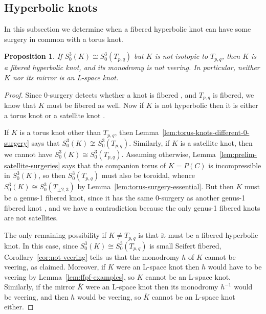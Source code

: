\documentclass[11pt]{amsart}
\newtheorem {proposition}[theorem]{Proposition}
\numberwithin{equation}{section}
\numberwithin{theorem}{section}
\theoremstyle{definition}
\newcommand{\mirror}[1]{\overline{#1}}
\begin{document}
%
%
%

\subsection{Hyperbolic knots}

In this subsection we determine when a fibered hyperbolic knot can have some surgery in common with a torus knot.

\begin{proposition} \label{prop:hyperbolic}
If $S^3_0(K) \cong S^3_0(T_{p,q})$ but $K$ is not isotopic to $T_{p,q}$, then $K$ is a fibered hyperbolic knot, and its monodromy is not veering.  In particular, neither $K$ nor its mirror is an L-space knot.
\end{proposition}

\begin{proof}
Since 0-surgery detects whether a knot is fibered \cite{gabai-foliations3}, and $T_{p,q}$ is fibered, we know that $K$ must be fibered as well.  Now if $K$ is not hyperbolic then it is either a torus knot or a satellite knot \cite[Corollary~2.5]{thurston-kleinian}.

If $K$ is a torus knot other than $T_{p,q}$, then Lemma~\ref{lem:torus-knots-different-0-surgery} says that $S^3_0(K) \not\cong S^3_0(T_{p,q})$.  Similarly, if $K$ is a satellite knot, then we cannot have $S^3_0(K) \cong S^3_0(T_{p,q})$.  Assuming otherwise, Lemma~\ref{lem:prelim-satellite-surgeries} says that the companion torus of $K=P(C)$ is incompressible in $S^3_0(K)$, so then $S^3_0(T_{p,q})$ must also be toroidal, whence $S^3_0(K) \cong S^3_0(T_{\pm2,3})$ by Lemma~\ref{lem:torus-surgery-essential}.  But then $K$ must be a genus-1 fibered knot, since it has the same $0$-surgery as another genus-1 fibered knot \cite{gabai-foliations3}, and we have a contradiction because the only genus-1 fibered knots are not satellites.

The only remaining possibility if $K\neq T_{p,q}$ is that it must be a fibered hyperbolic knot.  In this case, since $S^3_0(K) \cong S^3_0(T_{p,q})$ is small Seifert fibered, Corollary~\ref{cor:not-veering} tells us that the monodromy $h$ of $K$ cannot be veering, as claimed.  Moreover, if $K$ were an L-space knot then $h$ would have to be veering by Lemma~\ref{lem:ffpf-examples}, so $K$ cannot be an L-space knot.  Similarly, if the mirror $\mirror{K}$ were an L-space knot then its monodromy $h^{-1}$ would be veering, and then $h$ would be veering, so $\mirror{K}$ cannot be an L-space knot either.
\end{proof}
\end{document}
